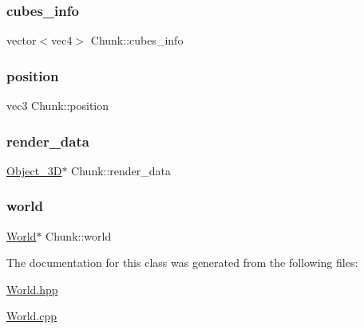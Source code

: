 \subsubsection{\texorpdfstring{cubes\+\_\+info}{cubes\_info}}
{\footnotesize\ttfamily vector$<$vec4$>$ Chunk\+::cubes\+\_\+info\hspace{0.3cm}{\ttfamily [private]}}

\mbox{\label{classChunk_a7dd254022526601cff0078424b3c1a9e}} 
\subsubsection{\texorpdfstring{position}{position}}
{\footnotesize\ttfamily vec3 Chunk\+::position}

\mbox{\label{classChunk_a76087b66e157921b725b896b5b254fd0}} 
\subsubsection{\texorpdfstring{render\+\_\+data}{render\_data}}
{\footnotesize\ttfamily \mbox{\hyperlink{classObject__3D}{Object\+\_\+3D}}$\ast$ Chunk\+::render\+\_\+data\hspace{0.3cm}{\ttfamily [private]}}

\mbox{\label{classChunk_aba16bedd07d267d54c85b3c57cd6ca31}} 
\subsubsection{\texorpdfstring{world}{world}}
{\footnotesize\ttfamily \mbox{\hyperlink{classWorld}{World}}$\ast$ Chunk\+::world\hspace{0.3cm}{\ttfamily [private]}}



The documentation for this class was generated from the following files\+:\begin{DoxyCompactItemize}
\item 
\mbox{\hyperlink{World_8hpp}{World.\+hpp}}\item 
\mbox{\hyperlink{World_8cpp}{World.\+cpp}}\end{DoxyCompactItemize}
